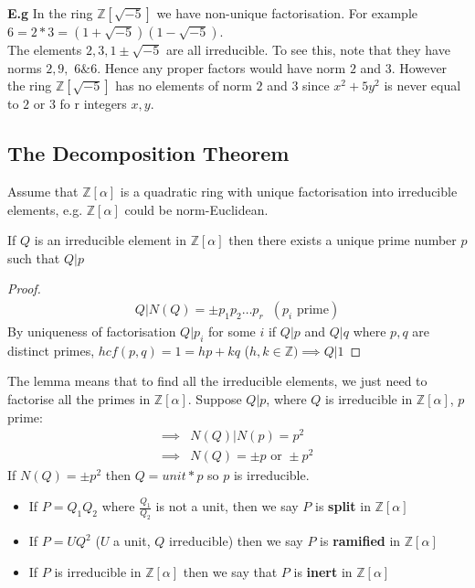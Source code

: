 \documentclass[11pt]{article}
\begin{document}
\textbf{E.g} In the ring $\mathbb{Z}[\sqrt{-5}]$ we have non-unique factorisation. For example $6=2*3 = (1+\sqrt{-5})(1-\sqrt{-5})$.\\[2em]


The elements $2,3, 1\pm \sqrt{-5} $ are all irreducible. To see this, note that they have norms $2,9, $ $6 \& 6 $. Hence any proper factors would have norm $2 $ and $3 $. However the ring $\mathbb{Z}[\sqrt{-5}]$ has no elements of norm $2$ and $3$ since $x^2+ 5y^2$ is never equal to $2$ or $3$ fo r integers $x,y$.

\subsection{The Decomposition Theorem}

Assume that $\mathbb{Z}[\alpha]$ is a quadratic ring with unique factorisation into irreducible elements, e.g. $\mathbb{Z}[\alpha]$ could be norm-Euclidean.


\begin{lemma}
	If $Q$ is an irreducible element in $\mathbb{Z}[\alpha]$ then there exists a unique prime number $p$ such that $Q|p$
\end{lemma}


\begin{proof}
	\begin{align*}
		Q|N(Q) = \pm p_1p_2 \dots  p_r \hspace{7pt} (p_i\text{ prime})
	\end{align*}
	By uniqueness of factorisation $Q|p_i$ for some $i$ if $Q|p$ and  $Q|q$  where $p,q$ are distinct primes, $hcf(p,q) = 1 = hp+kq$ ($h, k \in \mathbb{Z})  \implies Q|1 $ \lightning
\end{proof}

The lemma means that to find all the irreducible elements, we just need to factorise all the primes in $\mathbb{Z}[\alpha]$. Suppose $Q|p$, where $Q$ is irreducible in $\mathbb{Z}[\alpha]$, $p$ prime:
\begin{align*}
	\implies & N(Q) | N(p) = p^2\\
	\implies & N(Q) = \pm p \text{ or } \pm p^2
\end{align*}
If $N(Q) = \pm p^2 $ then $Q = unit * p $ so $p$ is irreducible.





\begin{itemize}
	\item{If $P=Q_1Q_2$ where $\frac{Q_1}{Q_2}$ is not a unit, then we say $P$ is \textbf{split} in $\mathbb{Z}[\alpha]$ }
	\item{If $P = UQ^2$ ($U $ a unit, $Q $ irreducible) then we say $P$ is \textbf{ramified} in $\mathbb{Z}[\alpha]$  } 
	\item{If $P$ is irreducible in $\mathbb{Z}[\alpha]$ then we say that $P$ is \textbf{inert} in $\mathbb{Z}[\alpha]$}
\end{itemize}
\end{document}

